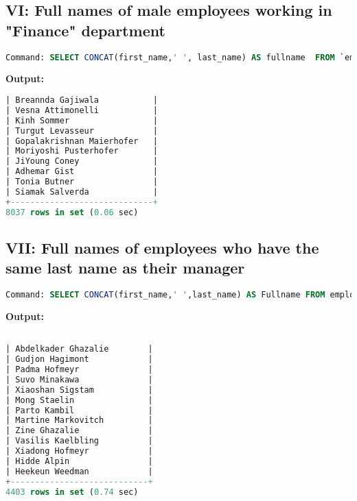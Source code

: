 \documentclass[12pt]{report}
\begin{document}
\subsection*{VI: Full names of male employees working in "Finance" department}

\begin{lstlisting}[language=sql]
Command: SELECT CONCAT(first_name,' ', last_name) AS fullname  FROM `employees` t1 JOIN `dept_emp` t2 ON t1.emp_no=t2.emp_no JOIN `departments` t3 ON t2.dept_no=t3.dept_no WHERE t3.`dept_name` = 'Marketing' AND t1.gender='F';
\end{lstlisting}
\textbf{Output:}
\begin{lstlisting}[language=sql]
| Breannda Gajiwala           |
| Vesna Attimonelli           |
| Kinh Sommer                 |
| Turgut Levasseur            |
| Gopalakrishnan Maierhofer   |
| Moriyoshi Pusterhofer       |
| JiYoung Coney               |
| Adhemar Gist                |
| Tonia Butner                |
| Siamak Salverda             |
+-----------------------------+
8037 rows in set (0.06 sec)

\end{lstlisting}

\subsection*{VII: Full names of employees who have the same last name as
their manager}

\begin{lstlisting}[language=sql]
Command: SELECT CONCAT(first_name,' ',last_name) AS Fullname FROM employees e1 WHERE e1.last_name IN (SELECT last_name FROM employees e2 JOIN dept_manager dm ON e2.emp_no=dm.emp_no);

\end{lstlisting}
\textbf{Output:}
\begin{lstlisting}[language=sql]

| Abdelkader Ghazalie        |
| Gudjon Hagimont            |
| Padma Hofmeyr              |
| Suvo Minakawa              |
| Xiaoshan Sigstam           |
| Mong Staelin               |
| Parto Kambil               |
| Martine Markovitch         |
| Zine Ghazalie              |
| Vasilis Kaelbling          |
| Xiadong Hofmeyr            |
| Hidde Alpin                |
| Heekeun Weedman            |
+----------------------------+
4403 rows in set (0.74 sec)

\end{lstlisting}
\end{document}
